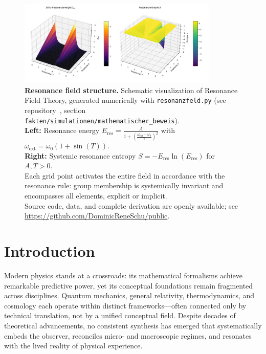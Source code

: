 \documentclass[12pt]{article}
\begin{document}
\begin{figure}[ht]
	\centering
	\includegraphics[width=0.85\textwidth]{figures/plot.png}
	\caption{
		\textbf{Resonance field structure.}
		Schematic visualization of Resonance Field Theory, generated numerically with \texttt{resonanzfeld.py} (see repository~\cite{rftrepo}, section \texttt{fakten/simulationen/mathematischer\_beweis}).\\
		\textbf{Left:} Resonance energy $E_{\mathrm{res}} = \frac{A}{1 + \left(\frac{\omega_\mathrm{ext} - \omega_0}{\gamma}\right)^2}$ with $\omega_\mathrm{ext} = \omega_0 (1 + \sin(T))$.\\
		\textbf{Right:} Systemic resonance entropy $S = -E_{\mathrm{res}}\ln(E_{\mathrm{res}})$ for $A, T > 0$.\\
		Each grid point activates the entire field in accordance with the resonance rule: group membership is systemically invariant and encompasses all elements, explicit or implicit.\\
		Source code, data, and complete derivation are openly available; see \url{https://github.com/DominicReneSchu/public}.
	}
	\label{fig:resonance_field_plot}
\end{figure}

\section{Introduction}

Modern physics stands at a crossroads: its mathematical formalisms achieve remarkable predictive power, yet its conceptual foundations remain fragmented across disciplines. Quantum mechanics, general relativity, thermodynamics, and cosmology each operate within distinct frameworks—often connected only by technical translation, not by a unified conceptual field. Despite decades of theoretical advancements, no consistent synthesis has emerged that systematically embeds the observer, reconciles micro- and macroscopic regimes, and resonates with the lived reality of physical experience.
\end{document}
